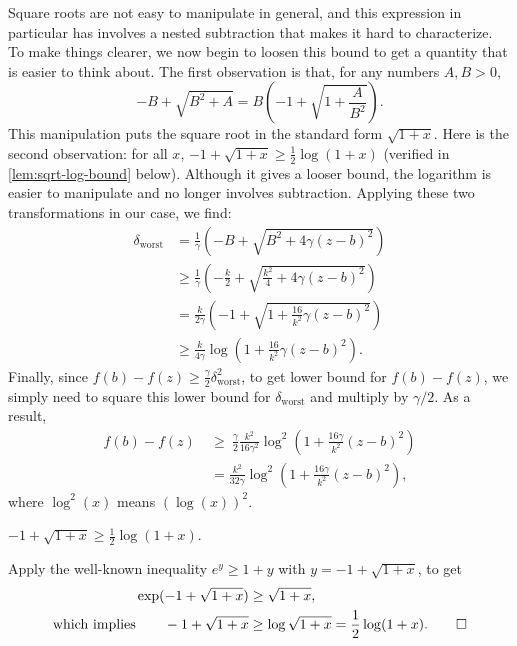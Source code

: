 \begin{lproof}
Square roots are not easy to manipulate in general, and this expression in particular has involves a nested subtraction that makes it hard to characterize.
To make things clearer, we now begin to loosen this bound to get a quantity that
    is easier to think about.
The first observation is that, for any numbers $A, B > 0$,
\[
    - B + \sqrt{B^2 + A} = B \left( -1 + \sqrt{1 + \frac{A}{B^2}} \right).
\]
This manipulation puts the square root in the standard form $\sqrt{1 + x}$.
Here is the second observation: for all $x$, $-1 + \sqrt{1+ x} \ge \frac12 \log(1+ x)$
    (verified in \cref{lem:sqrt-log-bound} below).
Although it gives a looser bound, the logarithm is easier to manipulate and no longer involves subtraction.
Applying these two transformations in our case, we find:
\begin{align*}
     \delta_{\text{worst}} &=
     \frac{1}{\gamma}
        \left( - B + \sqrt{ B^2 + 4 \gamma (z-b)^2 } \right)\\
    &\ge \frac{1}{\gamma}
        \left( - \frac k2 + \sqrt{ \frac{k^2}{4} + 4 \gamma (z-b)^2 } \right)\\
    &= \frac{k}{2 \gamma}
       \left( -1 + \sqrt{ 1 + \frac{16}{k^2} \gamma  (z-b)^2 } \right)
       \\
    &\ge \frac{k}{4\gamma}
        \log \left( 1 +  \frac{16}{k^2} \gamma (z-b)^2 \right)
    .
\end{align*}
Finally, since $f(b) - f(z) \ge \frac\gamma2 \delta_{\text{worst}}^2$, to get lower bound for $f(b) - f(z)$, we simply need to square this lower bound for $\delta_{\text{worst}}$ and multiply by $\gamma/2$.
As a result,
\begin{align*}
    f(b) - f(z) ~&\ge~
    \frac\gamma2 \frac{k^2}{16 \gamma^2}
        \log^2 \left(
            1 +  \frac{16 \gamma}{k^2} (z-b)^2 
        \right)
        \\
    &= \frac{k^2}{32 \gamma}
            \log^2 \left(
                1 +  \frac{16 \gamma}{k^2} (z-b)^2
             \right)
        ,
\end{align*}
where $\log^2(x)$ means $(\log(x))^2$.
\end{lproof}

\begin{lemma}\label{lem:sqrt-log-bound}
    $-1 + \sqrt{1+ x} \ge \frac12 \log(1+ x)$.
\end{lemma}
\begin{lproof}
    Apply the well-known inequality $e^{y} \ge 1 + y$
    with $y = -1 + \sqrt{1 + x}$, to get
    \begin{align*}
        \exp(-1 + \sqrt{1+x}) &\ge \sqrt{1+x}, \\
        \text{which implies}\qquad
        -1 + \sqrt{1+x} &\ge \log \sqrt{1+x}
            = \frac12 \log(1+x).
            \qedhere
    \end{align*}
\end{lproof}

